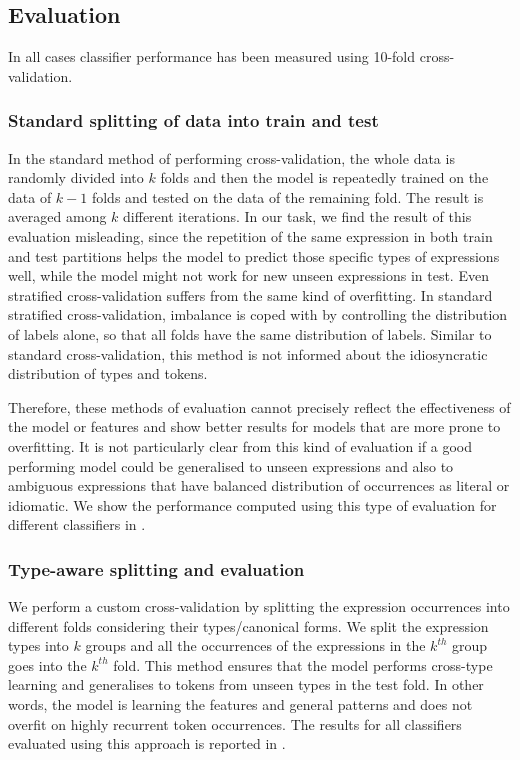 \documentclass[output=paper
,modfonts
,nonflat]{langsci/langscibook}
\begin{document}
\subsection{Evaluation}

In all cases classifier performance has been measured using 10-fold cross-validation.

\subsubsection{Standard splitting of data into train and test}
In the standard method of performing cross-validation, the whole data is randomly divided into $k$ folds and then the model is repeatedly trained on the data of $k-1$ folds and tested on the data of the remaining fold. The result is averaged among $k$ different iterations. In our task, we find the result of this evaluation misleading, since the repetition of the same expression in both train and test partitions helps the model to predict those specific types of expressions well, while the model might not work for new unseen expressions in test. Even stratified cross-validation suffers from the same kind of overfitting. In standard stratified cross-validation, imbalance is coped with by controlling the distribution of labels alone, so that all folds have the same distribution of labels. Similar to standard cross-validation, this method is not informed about the idiosyncratic distribution of types and tokens.

Therefore, these methods of evaluation cannot precisely reflect the effectiveness of the model or features and show better results for models that are more prone to overfitting. It is not particularly clear from this kind of evaluation if a good performing model could be generalised to unseen expressions and also to ambiguous expressions that have balanced distribution of occurrences as literal or idiomatic.
We show the performance computed using this type of evaluation for different classifiers in .


\subsubsection{Type-aware splitting and evaluation}


We perform a custom cross-validation by splitting the expression occurrences into different folds considering their types/canonical forms. We split the expression types into $k$ groups and all the occurrences of the expressions in the $k^{th}$ group goes into the $k^{th}$ fold. 
This method ensures that the model performs cross-type learning and generalises to tokens from unseen types in the test fold. In other words, the model is learning the features and general patterns and does not overfit on highly recurrent token occurrences.
The results for all classifiers evaluated using this approach is reported in .
\end{document}
